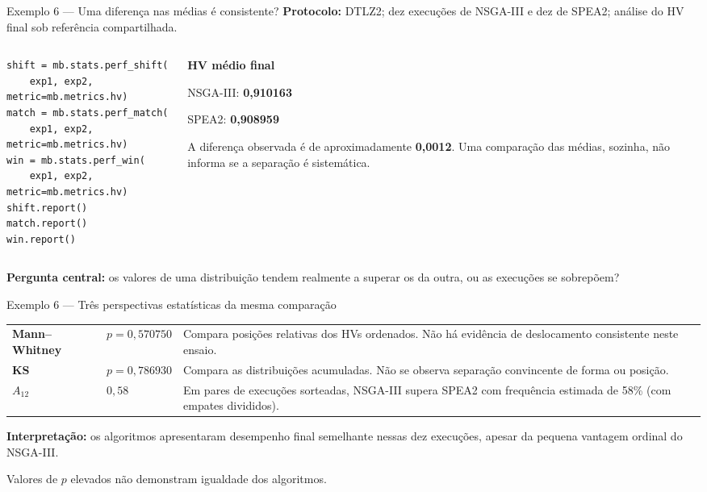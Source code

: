 \begin{frame}[fragile]{Exemplo 6 — Uma diferença nas médias é consistente?}
\textbf{Protocolo:} DTLZ2; dez execuções de NSGA-III e dez de SPEA2; análise do HV final sob referência compartilhada.
\begin{columns}[T,onlytextwidth]
\begin{column}{.57\textwidth}
\begin{lstlisting}[style=python,basicstyle=\ttfamily\fontsize{7.6}{9.5}\selectfont]
shift = mb.stats.perf_shift(
    exp1, exp2, metric=mb.metrics.hv)
match = mb.stats.perf_match(
    exp1, exp2, metric=mb.metrics.hv)
win = mb.stats.perf_win(
    exp1, exp2, metric=mb.metrics.hv)
shift.report()
match.report()
win.report()
\end{lstlisting}
\end{column}
\begin{column}{.41\textwidth}
\textbf{HV médio final}
\par\smallskip NSGA-III: \textbf{0,910163}
\par SPEA2: \textbf{0,908959}
\par\medskip
A diferença observada é de aproximadamente \textbf{0,0012}. Uma comparação das médias, sozinha, não informa se a separação é sistemática.
\end{column}
\end{columns}
\vspace{.1cm}\textbf{Pergunta central:} os valores de uma distribuição tendem realmente a superar os da outra, ou as execuções se sobrepõem?
\end{frame}

\begin{frame}{Exemplo 6 — Três perspectivas estatísticas da mesma comparação}
\renewcommand{\arraystretch}{1.4}
\begin{tabularx}{\linewidth}{@{}>{\bfseries}p{.25\linewidth}p{.17\linewidth}X@{}}
Mann--Whitney & $p=0{,}570750$ & Compara posições relativas dos HVs ordenados. Não há evidência de deslocamento consistente neste ensaio.\\
KS & $p=0{,}786930$ & Compara as distribuições acumuladas. Não se observa separação convincente de forma ou posição.\\
$A_{12}$ & $0{,}58$ & Em pares de execuções sorteadas, NSGA-III supera SPEA2 com frequência estimada de 58\% (com empates divididos).\\
\end{tabularx}
\vspace{.13cm}
\textbf{Interpretação:} os algoritmos apresentaram desempenho final semelhante nessas dez execuções, apesar da pequena vantagem ordinal do NSGA-III.
\par{\scriptsize Valores de $p$ elevados não demonstram igualdade dos algoritmos.}
\end{frame}
